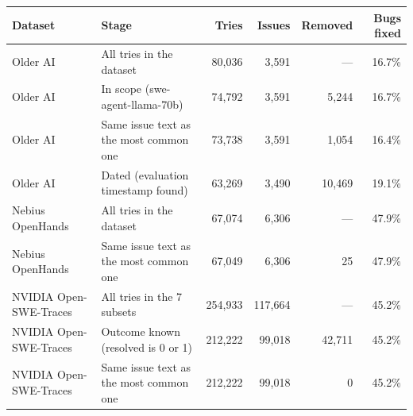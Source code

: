 \begin{tabular}{llrrrr}
\toprule
Dataset & Stage & Tries & Issues & Removed & Bugs fixed \\
\midrule
Older AI & All tries in the dataset & 80,036 & 3,591 & — & 16.7\% \\
Older AI & In scope (swe-agent-llama-70b) & 74,792 & 3,591 & 5,244 & 16.7\% \\
Older AI & Same issue text as the most common one & 73,738 & 3,591 & 1,054 & 16.4\% \\
Older AI & Dated (evaluation timestamp found) & 63,269 & 3,490 & 10,469 & 19.1\% \\
Nebius OpenHands & All tries in the dataset & 67,074 & 6,306 & — & 47.9\% \\
Nebius OpenHands & Same issue text as the most common one & 67,049 & 6,306 & 25 & 47.9\% \\
NVIDIA Open-SWE-Traces & All tries in the 7 subsets & 254,933 & 117,664 & — & 45.2\% \\
NVIDIA Open-SWE-Traces & Outcome known (resolved is 0 or 1) & 212,222 & 99,018 & 42,711 & 45.2\% \\
NVIDIA Open-SWE-Traces & Same issue text as the most common one & 212,222 & 99,018 & 0 & 45.2\% \\
\bottomrule
\end{tabular}
